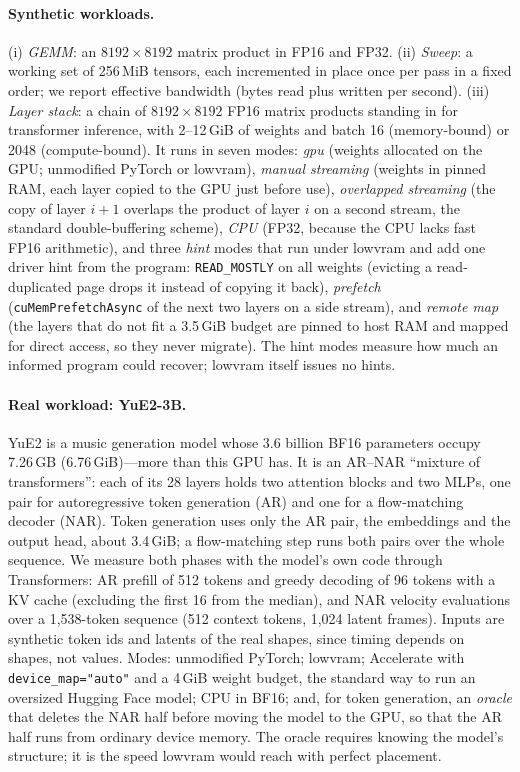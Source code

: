 \documentclass[11pt]{article}
\begin{document}
\paragraph{Synthetic workloads.}
(i) \emph{GEMM}: an $8192\times8192$ matrix product in FP16 and FP32.
(ii) \emph{Sweep}: a working set of 256\,MiB tensors, each incremented in place once per pass in a
fixed order; we report effective bandwidth (bytes read plus written per second).
(iii) \emph{Layer stack}: a chain of $8192\times8192$ FP16 matrix products standing in for
transformer inference, with 2--12\,GiB of weights and batch 16 (memory-bound) or 2048
(compute-bound). It runs in seven modes: \emph{gpu} (weights allocated on the GPU; unmodified
PyTorch or lowvram), \emph{manual streaming} (weights in pinned RAM, each layer copied to the GPU
just before use), \emph{overlapped streaming} (the copy of layer $i{+}1$ overlaps the product of
layer $i$ on a second stream, the standard double-buffering scheme), \emph{CPU} (FP32, because
the CPU lacks fast FP16 arithmetic), and three \emph{hint} modes that run under lowvram and add one
driver hint from the program: \texttt{READ\_MOSTLY} on all weights (evicting a read-duplicated
page drops it instead of copying it back), \emph{prefetch} (\texttt{cuMemPrefetchAsync} of the
next two layers on a side stream), and \emph{remote map} (the layers that do not fit a 3.5\,GiB
budget are pinned to host RAM and mapped for direct access, so they never migrate). The hint modes
measure how much an informed program could recover; lowvram itself issues no hints.

\paragraph{Real workload: YuE2-3B.} YuE2 \cite{yue2} is a music generation model whose
3.6 billion BF16 parameters occupy 7.26\,GB (6.76\,GiB)---more than this GPU has. It is an AR--NAR
``mixture of transformers'': each of its 28 layers holds two attention blocks and two MLPs, one
pair for autoregressive token generation (AR) and one for a flow-matching decoder (NAR). Token
generation uses only the AR pair, the embeddings and the output head, about 3.4\,GiB; a
flow-matching step runs both pairs over the whole sequence. We measure both phases with the model's
own code through Transformers: AR prefill of 512 tokens and greedy decoding of 96 tokens with a KV
cache (excluding the first 16 from the median), and NAR velocity evaluations over a 1,538-token
sequence (512 context tokens, 1,024 latent frames). Inputs are synthetic token ids and latents of
the real shapes, since timing depends on shapes, not values. Modes: unmodified PyTorch;
lowvram; Accelerate \cite{accelerate} with \texttt{device\_map="auto"} and a 4\,GiB weight budget,
the standard way to run an oversized Hugging Face model; CPU in BF16; and, for token generation, an
\emph{oracle} that deletes the NAR half before moving the model to the GPU, so that the AR half
runs from ordinary device memory. The oracle requires knowing the model's structure; it is the
speed lowvram would reach with perfect placement.
\end{document}
